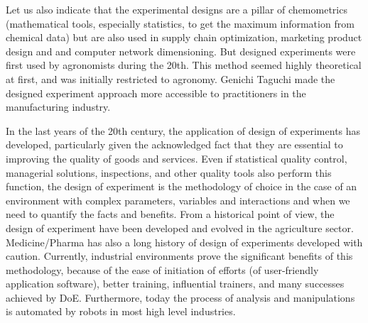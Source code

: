 	Let us also indicate that the experimental designs are a pillar of chemometrics (mathematical tools, especially statistics, to get the maximum information from chemical data) but are also used in supply chain optimization, marketing product design and and computer network dimensioning. But designed experiments were first used by agronomists during the 20th. This method seemed highly theoretical at first, and was initially restricted to agronomy. Genichi Taguchi made the designed experiment approach more accessible to practitioners in the manufacturing industry.

	In the last years of the 20th century, the application of design of experiments has developed, particularly given the acknowledged fact that they are essential to improving the quality of goods and services. Even if statistical quality control, managerial solutions, inspections, and other quality tools also perform this function, the design of experiment is the methodology of choice in the case of an environment with complex parameters, variables and interactions and when we need to quantify the facts and benefits. From a historical point of view, the design of experiment have been developed and evolved in the agriculture sector. Medicine/Pharma has also a long history of design of experiments developed with caution. Currently, industrial environments prove the significant benefits of this methodology, because of the ease of initiation of efforts (of user-friendly application software), better training, influential trainers, and many successes achieved by DoE. Furthermore, today the process of analysis and manipulations is automated by robots in most high level industries.
	
